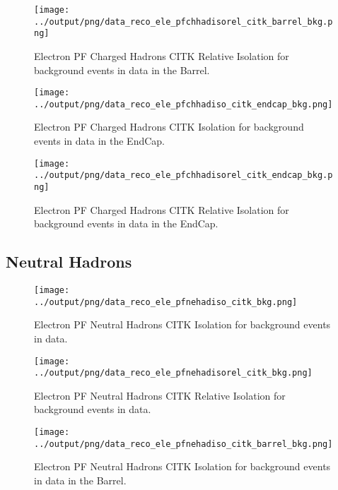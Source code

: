 \documentclass[11pt]{book}
\begin{document}
\begin{figure}[htb]
\centering
\texttt{[image: ../output/png/data\_reco\_ele\_pfchhadisorel\_citk\_barrel\_bkg.png]}
\caption{Electron PF Charged Hadrons CITK Relative Isolation for background events in data in the Barrel.}
\label{fig:data_ele_pfchhadisorel_citk_barrel_bkg}
\end{figure}

\begin{figure}[htb]
\centering
\texttt{[image: ../output/png/data\_reco\_ele\_pfchhadiso\_citk\_endcap\_bkg.png]}
\caption{Electron PF Charged Hadrons CITK Isolation for background events in data in the EndCap.}
\label{fig:data_ele_pfchhadiso_citk_endcap_bkg}
\end{figure}

\begin{figure}[htb]
\centering
\texttt{[image: ../output/png/data\_reco\_ele\_pfchhadisorel\_citk\_endcap\_bkg.png]}
\caption{Electron PF Charged Hadrons CITK Relative Isolation for background events in data in the EndCap.}
\label{fig:data_ele_pfchhadisorel_citk_endcap_bkg}
\end{figure}
\clearpage

\subsection{Neutral Hadrons}
\begin{figure}[htb]
\centering
\texttt{[image: ../output/png/data\_reco\_ele\_pfnehadiso\_citk\_bkg.png]}
\caption{Electron PF Neutral Hadrons CITK Isolation for background events in data.}
\label{fig:data_ele_pfnehadiso_citk_bkg}
\end{figure}

\begin{figure}[htb]
\centering
\texttt{[image: ../output/png/data\_reco\_ele\_pfnehadisorel\_citk\_bkg.png]}
\caption{Electron PF Neutral Hadrons CITK Relative Isolation for background events in data.}
\label{fig:data_ele_pfnehadisorel_citk_bkg}
\end{figure}

\begin{figure}[htb]
\centering
\texttt{[image: ../output/png/data\_reco\_ele\_pfnehadiso\_citk\_barrel\_bkg.png]}
\caption{Electron PF Neutral Hadrons CITK Isolation for background events in data in the Barrel.}
\label{fig:data_ele_pfnehadiso_citk_barrel_bkg}
\end{figure}
\end{document}
